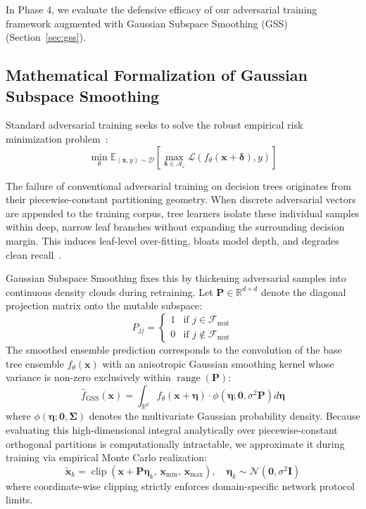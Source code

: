 \documentclass[final,5p,times,twocolumn]{elsarticle}
\begin{document}
In Phase 4, we evaluate the defensive efficacy of our adversarial training framework augmented with Gaussian Subspace Smoothing (GSS) (Section~\ref{sec:gss}).

\subsection{Mathematical Formalization of Gaussian Subspace Smoothing}
Standard adversarial training seeks to solve the robust empirical risk minimization problem~\cite{madry2018towards}:
\begin{equation}
    \min_\theta \mathbb{E}_{(\mathbf{x}, y) \sim \mathcal{D}} \left[ \max_{\boldsymbol{\delta} \in \mathcal{A}_\varepsilon} \mathcal{L}(f_\theta(\mathbf{x} + \boldsymbol{\delta}), y) \right]
\end{equation}

The failure of conventional adversarial training on decision trees originates from their piecewise-constant partitioning geometry. When discrete adversarial vectors are appended to the training corpus, tree learners isolate these individual samples within deep, narrow leaf branches without expanding the surrounding decision margin. This induces leaf-level over-fitting, bloats model depth, and degrades clean recall~\cite{tramer2020adaptive}.

Gaussian Subspace Smoothing fixes this by thickening adversarial samples into continuous density clouds during retraining. Let $\mathbf{P} \in \mathbb{R}^{d \times d}$ denote the diagonal projection matrix onto the mutable subspace:
\begin{equation}
    P_{jj} = \begin{cases} 1 & \text{if } j \in \mathcal{F}_{\text{mut}} \\ 0 & \text{if } j \notin \mathcal{F}_{\text{mut}} \end{cases}
\end{equation}
The smoothed ensemble prediction corresponds to the convolution of the base tree ensemble $f_\theta(\mathbf{x})$ with an anisotropic Gaussian smoothing kernel whose variance is non-zero exclusively within $\operatorname{range}(\mathbf{P})$:
\begin{equation}
    \hat{f}_{\text{GSS}}(\mathbf{x}) = \int_{\mathbb{R}^d} f_\theta(\mathbf{x} + \boldsymbol{\eta}) \cdot \phi\left(\boldsymbol{\eta}; \mathbf{0}, \sigma^2 \mathbf{P}\right) d\boldsymbol{\eta}
\end{equation}
where $\phi(\boldsymbol{\eta}; \mathbf{0}, \boldsymbol{\Sigma})$ denotes the multivariate Gaussian probability density. Because evaluating this high-dimensional integral analytically over piecewise-constant orthogonal partitions is computationally intractable, we approximate it during training via empirical Monte Carlo realization:
\begin{equation}
    \tilde{\mathbf{x}}_k = \operatorname{clip}\left(\mathbf{x} + \mathbf{P}\boldsymbol{\eta}_k, \, \mathbf{x}_{\min}, \, \mathbf{x}_{\max}\right), \quad \boldsymbol{\eta}_k \sim \mathcal{N}\left(\mathbf{0}, \sigma^2 \mathbf{I}\right)
\end{equation}
where coordinate-wise clipping strictly enforces domain-specific network protocol limits.
\end{document}
